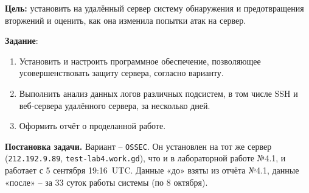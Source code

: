 \textbf{Цель:} установить на удалённый сервер систему обнаружения и
предотвращения вторжений и оценить, как она изменила попытки атак на
сервер.

\vspace{1em}

\textbf{Задание}:
\begin{enumerate}
  \item Установить и настроить программное обеспечение, позволяющее
  усовершенствовать защиту сервера, согласно варианту.
  \item Выполнить анализ данных логов различных подсистем, в том числе
  SSH и веб-сервера удалённого сервера, за несколько дней.
  \item Оформить отчёт о проделанной работе.
\end{enumerate}

\textbf{Постановка задачи.} Вариант -- \texttt{OSSEC}. Он установлен на
тот же сервер (\texttt{212.192.9.89}, \texttt{test-lab4.work.gd}), что и в
лабораторной работе №4.1, и работает с 5 сентября 19:16~UTC. Данные «до»
взяты из отчёта №4.1, данные «после» -- за 33 суток работы системы
(по 8 октября).
